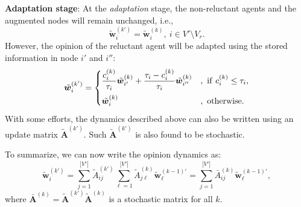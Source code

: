 \documentclass[letter]{article}
\theoremstyle{remark}
\begin{document}

\textbf{Adaptation stage}: At the \emph{adaptation} stage, the non-reluctant agents and the augmented nodes will remain unchanged, i.e.,
\[
\tilde{\bm w}_i^{(k')} = \tilde{\bm w}_i^{(k)},~i \in V' \setminus V_r.
\]
However, the opinion of the reluctant agent will be adapted using the stored information in node $i'$ and $i''$:
\[
\tilde{\bm w}_i^{(k')} = \begin{cases}
\displaystyle \frac{c_i^{(k)}}{\tau_i} \tilde{\bm w}_{i'}^{(k)} + \frac{\tau_i - c_i^{(k)}}{\tau_i} \tilde{\bm w}_{i''}^{(k)} &,~{\rm if}~c_i^{(k)} \leq \tau_i, \vspace{.2cm} \\
\tilde{\bm w}_i^{(k)} &,~{\rm otherwise}.
\end{cases}
\]
With some efforts, the dynamics described above can also be written using an update matrix $\tilde{\bm A}^{(k')}$. Such $\tilde{\bm A}^{(k')}$ is also found to be stochastic.

To summarize, we can now write the opinion dynamics as:
\[
\tilde{\bm w}_i^{(k')} = \sum_{j=1}^{|V'|} \tilde{A}_{ij}^{(k')} \sum_{\ell=1}^{|V'|} \tilde{A}_{j \ell}^{(k)} \tilde{\bm w}_{\ell}^{(k-1)'} =  \sum_{j=1}^{|V'|} \bar{A}_{ij}^{(k)} \tilde{\bm w}_{\ell}^{(k-1)'},
\]
where $\bar{\bm A}^{(k)} = \tilde{\bm A}^{(k')}  \tilde{\bm A}^{(k)}$ is a stochastic matrix for all $k$. 
\end{document}
